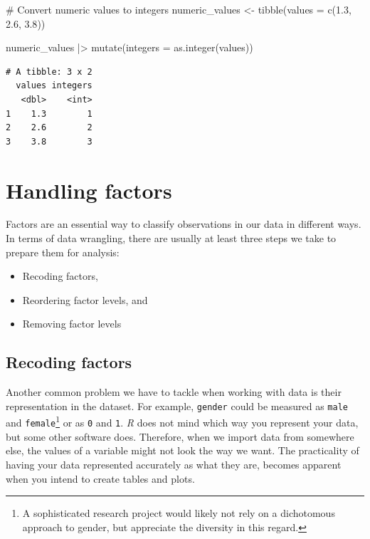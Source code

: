 \documentclass[
  letterpaper,
  DIV=11,
  numbers=noendperiod]{scrreprt}
\newenvironment{Shaded}{\begin{snugshade}}{\end{snugshade}}
\newcommand{\AttributeTok}[1]{\textcolor[rgb]{0.40,0.45,0.13}{#1}}
\newcommand{\CommentTok}[1]{\textcolor[rgb]{0.37,0.37,0.37}{#1}}
\newcommand{\FloatTok}[1]{\textcolor[rgb]{0.68,0.00,0.00}{#1}}
\newcommand{\FunctionTok}[1]{\textcolor[rgb]{0.28,0.35,0.67}{#1}}
\newcommand{\NormalTok}[1]{\textcolor[rgb]{0.00,0.23,0.31}{#1}}
\newcommand{\OtherTok}[1]{\textcolor[rgb]{0.00,0.23,0.31}{#1}}
\newcommand{\SpecialCharTok}[1]{\textcolor[rgb]{0.37,0.37,0.37}{#1}}
\providecommand{\tightlist}{%
  \setlength{\itemsep}{0pt}\setlength{\parskip}{0pt}}\usepackage{longtable,booktabs,array}
\begin{document}
\begin{Shaded}
\begin{Highlighting}[]
\CommentTok{\# Convert numeric values to integers}
\NormalTok{numeric\_values }\OtherTok{\textless{}{-}} \FunctionTok{tibble}\NormalTok{(}\AttributeTok{values =} \FunctionTok{c}\NormalTok{(}\FloatTok{1.3}\NormalTok{, }\FloatTok{2.6}\NormalTok{, }\FloatTok{3.8}\NormalTok{))}

\NormalTok{numeric\_values }\SpecialCharTok{|\textgreater{}}
  \FunctionTok{mutate}\NormalTok{(}\AttributeTok{integers =} \FunctionTok{as.integer}\NormalTok{(values))}
\end{Highlighting}
\end{Shaded}

\begin{verbatim}
# A tibble: 3 x 2
  values integers
   <dbl>    <int>
1    1.3        1
2    2.6        2
3    3.8        3
\end{verbatim}

\section{Handling factors}\label{sec-handling-factors}

Factors are an essential way to classify observations in our data in
different ways. In terms of data wrangling, there are usually at least
three steps we take to prepare them for analysis:

\begin{itemize}
\tightlist
\item
  Recoding factors,
\item
  Reordering factor levels, and
\item
  Removing factor levels
\end{itemize}

\subsection{Recoding factors}\label{sec-recoding-factors}

Another common problem we have to tackle when working with data is their
representation in the dataset. For example, \texttt{gender} could be
measured as \texttt{male} and \texttt{female}\footnote{A sophisticated
  research project would likely not rely on a dichotomous approach to
  gender, but appreciate the diversity in this regard.} or as \texttt{0}
and \texttt{1}. \emph{R} does not mind which way you represent your
data, but some other software does. Therefore, when we import data from
somewhere else, the values of a variable might not look the way we want.
The practicality of having your data represented accurately as what they
are, becomes apparent when you intend to create tables and plots.
\end{document}
